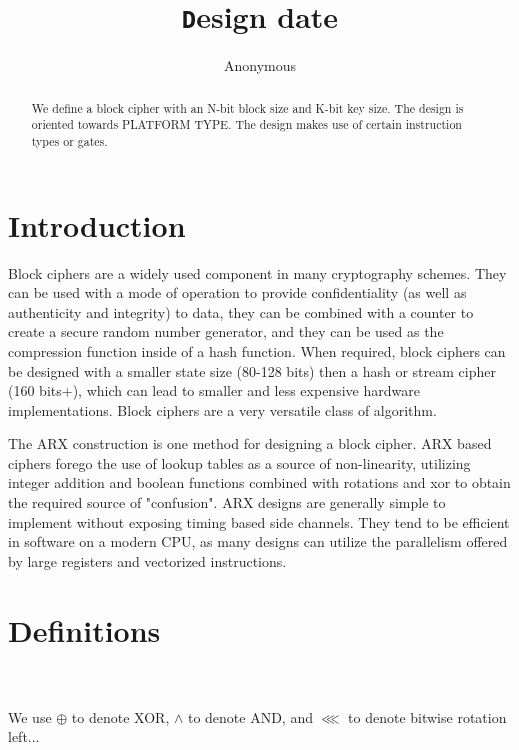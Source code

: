 \documentclass[preprint]{iacrtrans}
\author{Anonymous\inst{1}}
\institute{City, State \email{address@provider.com}}
\title[\texttt Design date]{\texttt Design date}
\begin{document}
\maketitle


\begin{abstract}
  We define a block cipher with an N-bit block size and K-bit key size. The design is oriented towards PLATFORM TYPE. The design makes use of certain instruction types or gates. \\ 
\end{abstract}

\todototoc
\listoftodos

\section{Introduction}
 Block ciphers are a widely used component in many cryptography schemes. They can be used with a mode of operation to provide confidentiality (as well as authenticity and integrity) to data, they can be combined with a counter to create a secure random number generator, and they can be used as the compression function inside of a hash function. When required, block ciphers can be designed with a smaller state size (80-128 bits) then a hash or stream cipher (160 bits+), which can lead to smaller and less expensive hardware implementations. Block ciphers are a very versatile class of algorithm.

The ARX construction is one method for designing a block cipher. ARX based ciphers forego the use of lookup tables as a source of non-linearity, utilizing integer addition and boolean functions combined with rotations and xor to obtain the required source of "confusion". ARX designs are generally simple to implement without exposing timing based side channels. They tend to be efficient in software on a modern CPU, as many designs can utilize the parallelism offered by large registers and vectorized instructions. 



\section{Definitions}
\\
\\
We use $\oplus$ to denote XOR, $\land$ to denote AND, and $\lll$ to denote bitwise rotation left...
\end{document}
